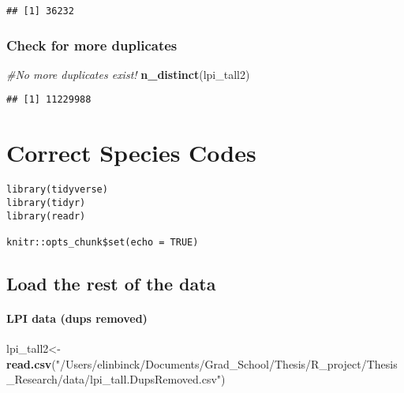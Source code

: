 \documentclass[
]{book}
\newenvironment{Shaded}{\begin{snugshade}}{\end{snugshade}}
\newcommand{\CommentTok}[1]{\textcolor[rgb]{0.56,0.35,0.01}{\textit{#1}}}
\newcommand{\KeywordTok}[1]{\textcolor[rgb]{0.13,0.29,0.53}{\textbf{#1}}}
\newcommand{\NormalTok}[1]{#1}
\newcommand{\OperatorTok}[1]{\textcolor[rgb]{0.81,0.36,0.00}{\textbf{#1}}}
\newcommand{\StringTok}[1]{\textcolor[rgb]{0.31,0.60,0.02}{#1}}
\begin{document}
\begin{Shaded}
\end{Shaded}

\begin{verbatim}
## [1] 36232
\end{verbatim}

\hypertarget{check-for-more-duplicates}{%
\subsection{Check for more duplicates}\label{check-for-more-duplicates}}

\begin{Shaded}
\begin{Highlighting}[]
\CommentTok{#No more duplicates exist!}
\KeywordTok{n_distinct}\NormalTok{(lpi_tall2)}
\end{Highlighting}
\end{Shaded}

\begin{verbatim}
## [1] 11229988
\end{verbatim}

\hypertarget{correct-species-codes}{%
\chapter{Correct Species Codes}\label{correct-species-codes}}

\begin{verbatim}
library(tidyverse)
library(tidyr)
library(readr)

knitr::opts_chunk$set(echo = TRUE)
\end{verbatim}

\hypertarget{load-the-rest-of-the-data}{%
\section{Load the rest of the data}\label{load-the-rest-of-the-data}}

\hypertarget{lpi-data-dups-removed}{%
\subsubsection{LPI data (dups removed)}\label{lpi-data-dups-removed}}

\begin{Shaded}
\begin{Highlighting}[]
\NormalTok{lpi_tall2<-}\StringTok{ }\KeywordTok{read.csv}\NormalTok{(}\StringTok{"/Users/elinbinck/Documents/Grad_School/Thesis/R_project/Thesis_Research/data/lpi_tall.DupsRemoved.csv"}\NormalTok{)}
\end{Highlighting}
\end{Shaded}
\end{document}
